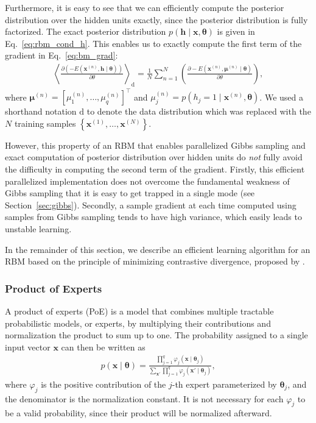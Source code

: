 \documentclass[dissertation,nocontribution,draft*]{aaltoseries}
\newcommand{\vect}[1]{\mathbf{#1}}
\newcommand{\vects}[1]{\boldsymbol{#1}}
\newcommand{\vh}[0]{\vect{h}}
\newcommand{\vx}[0]{\vect{x}}
\newcommand{\td}[0]{\text{d}}
\newcommand{\vmu}[0]{\vects{\mu}}
\newcommand{\TT}[0]{{\vects{\theta}}}
\begin{document}
Furthermore, it is easy to see that we can efficiently
compute the posterior distribution over the hidden units
exactly, since the posterior distribution is fully
factorized. The exact posterior distribution ${p(\vh \mid
\vx, \TT)}$ is given in Eq.~\eqref{eq:rbm_cond_h}. This
enables us to exactly compute the first term of the
gradient in Eq.~\eqref{eq:bm_grad}:
\begin{align}
    \label{eq:rbm_grad}
    \left< \frac{\partial
    \left(-E(\vx^{(n)}, \vh\mid\TT)\right)}{\partial \theta}
    \right>_{\td} = 
    \frac{1}{N} \sum_{n=1}^N \left( \frac{\partial
    -E(\vx^{(n)}, \vmu^{(n)} \mid \TT)}{\partial \theta}
    \right),
\end{align}
where $\vmu^{(n)} = \left[ \mu_1^{(n)}, \dots, \mu_q^{(n)}
\right]^\top$ and $\mu_j^{(n)} = p(h_j=1 \mid \vx^{(n)},
\TT)$. We used a shorthand notation $\td$ to denote the data
distribution which was replaced with the $N$
training samples $\left\{ \vx^{(1)}, \dots,
\vx^{(N)}\right\}$. 

However, this property of an RBM that enables parallelized
Gibbs sampling and exact computation of posterior
distribution over hidden units do \textit{not} fully avoid
the difficulty in computing the second term of the gradient.
Firstly, this efficient parallelized implementation does not
overcome the fundamental weakness of Gibbs sampling that it
is easy to get trapped in a single mode (see
Section~\ref{sec:gibbs}). Secondly, a sample gradient at
each time computed using samples from Gibbs sampling tends
to have high variance, which easily leads to unstable
learning.

In the remainder of this section, we describe an efficient
learning algorithm for an RBM based on the principle of
minimizing contrastive divergence, proposed by
\citet{Hinton2002}. 



\subsubsection{Product of Experts}
\label{sec:poe}

A product of experts (PoE) \citep{Hinton2002} is a model that
combines multiple tractable probabilistic models, or
experts, by multiplying their contributions and
normalization
the product to sum up to one. The probability assigned to a
single input vector $\vx$ can then be written as
\begin{align}
    \label{eq:poe}
    p(\vx \mid \TT) = \frac{\prod_{j=1}^q \varphi_j(\vx \mid
    \TT_j)}{\sum_{\vx'} \prod_{j=1}^q \varphi_j(\vx' \mid
    \TT_j)},
\end{align}
where $\varphi_j$ is the positive contribution of the $j$-th
expert parameterized by $\TT_j$, and the denominator is the
normalization constant. It is not necessary for each
$\varphi_j$ to be a valid probability, since their product
will be normalized afterward.
\end{document}
